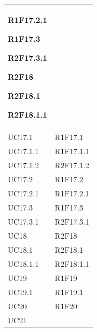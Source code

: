 \begin{center}
\begin{longtable}{|p{44mm}|p{22mm}|}
R1F17.2.1 \newline

R1F17.3 \newline

R2F17.3.1 \newline

R2F18 \newline

R2F18.1 \newline

R2F18.1.1 \newline
\\
\hline
UC17.1 &

R1F17.1 \newline
\\
\hline
UC17.1.1 &

R1F17.1.1 \newline
\\
\hline
UC17.1.2 &

R2F17.1.2 \newline
\\
\hline
UC17.2 &

R1F17.2 \newline
\\
\hline
UC17.2.1 &

R1F17.2.1 \newline
\\
\hline
UC17.3 &

R1F17.3 \newline
\\
\hline
UC17.3.1 &

R2F17.3.1 \newline
\\
\hline
UC18 &

R2F18 \newline
\\
\hline
UC18.1 &

R2F18.1 \newline
\\
\hline
UC18.1.1 &

R2F18.1.1 \newline
\\
\hline
UC19 &

R1F19 \newline
\\
\hline
UC19.1 &

R1F19.1 \newline
\\
\hline
UC20 &

R1F20 \newline
\\
\hline
UC21 &


\end{longtable}
\end{center}
